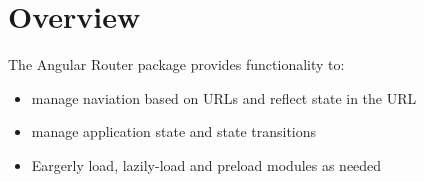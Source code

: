 \section{Overview}

The Angular Router package provides functionality to:

\begin{itemize}
  \item manage naviation based on URLs and reflect state in the URL
  \item manage application state and state transitions
  \item Eargerly load, lazily-load and preload modules as needed
\end{itemize}
